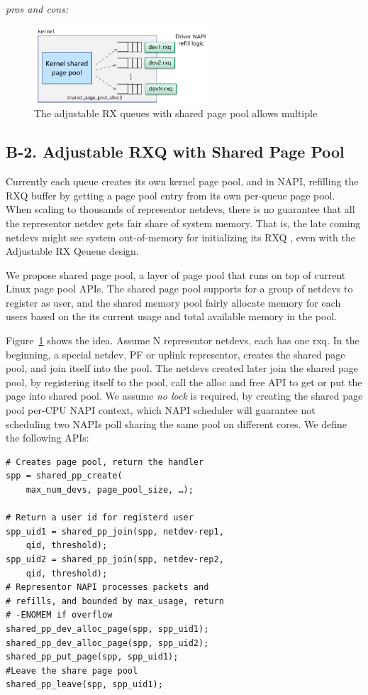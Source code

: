 \documentclass[letterpaper]{article}
\begin{document}
\textit{pros and cons:} 

\begin{figure}[t!]
\includegraphics[width=2.6in]{shared_page_pool.pdf}
\centering
\caption{The adjustable RX queues with shared page pool allows multiple}
\label{fig:shared_page_pool}
\end{figure}

\subsection{B-2. Adjustable RXQ with Shared Page Pool}
Currently each queue creates its own kernel page pool, and in NAPI, refilling
the RXQ buffer by getting a page pool entry from its own per-queue page pool.
When scaling to thousands of representor netdevs, there is no guarantee that
all the representor netdev gets fair share of system memory. That is, the late
coming netdevs might see system out-of-memory for initializing its RXQ ,
even with the Adjustable RX Qeueue design.

We propose shared page pool, a layer of page pool that runs on top of current
Linux page pool APIs. The shared page pool supports for a group of netdevs
to register as user, and the shared memory pool fairly allocate memory for
each users based on the its current usage and total available memory in
the pool.

Figure~\ref{fig:shared_page_pool} shows the idea.
Assume N representor netdevs, each has one rxq. In the beginning, a special
netdev, PF or uplink representor, creates the shared page pool, and join
itself into the pool. The netdevs created later join the shared page pool,
by registering itself to the pool, call the alloc and free API to
get or put the page into shared pool. We assume \emph{no lock} is required,
by creating the shared page pool per-CPU NAPI context, which NAPI scheduler
will guarantee not scheduling two NAPIs poll sharing the same pool on
different cores. We define the following APIs:
\begin{verbatim}
# Creates page pool, return the handler
spp = shared_pp_create(
    max_num_devs, page_pool_size, …);

# Return a user id for registerd user
spp_uid1 = shared_pp_join(spp, netdev-rep1,
    qid, threshold);
spp_uid2 = shared_pp_join(spp, netdev-rep2,
    qid, threshold);
# Representor NAPI processes packets and
# refills, and bounded by max_usage, return
# -ENOMEM if overflow
shared_pp_dev_alloc_page(spp, spp_uid1);
shared_pp_dev_alloc_page(spp, spp_uid2);
shared_pp_put_page(spp, spp_uid1);
#Leave the share page pool
shared_pp_leave(spp, spp_uid1); 
\end{verbatim}
\end{document}
